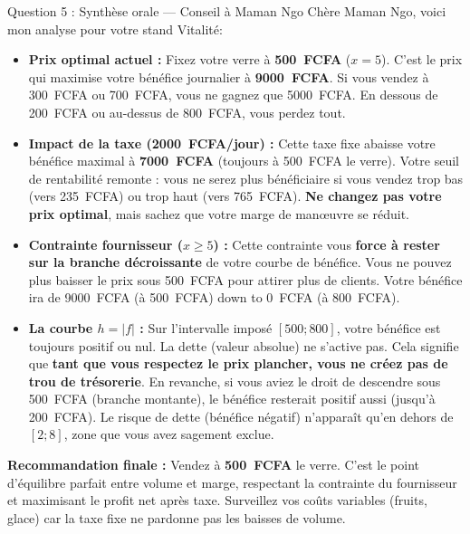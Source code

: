 \documentclass[11pt]{article}
\begin{document}
\begin{exoresolu}{Question 5 : Synthèse orale — Conseil à Maman Ngo}
\og Chère Maman Ngo, voici mon analyse pour votre stand \og Vitalité\fg :

\begin{itemize}
    \item \textbf{Prix optimal actuel :} Fixez votre verre à \textbf{\SI{500}{FCFA}} ($x=5$). C'est le prix qui maximise votre bénéfice journalier à \textbf{\SI{9000}{FCFA}}. Si vous vendez à \SI{300}{FCFA} ou \SI{700}{FCFA}, vous ne gagnez que \SI{5000}{FCFA}. En dessous de \SI{200}{FCFA} ou au-dessus de \SI{800}{FCFA}, vous perdez tout.
    \item \textbf{Impact de la taxe (\SI{2000}{FCFA}/jour) :} Cette taxe fixe abaisse votre bénéfice maximal à \textbf{\SI{7000}{FCFA}} (toujours à \SI{500}{FCFA} le verre). Votre seuil de rentabilité remonte : vous ne serez plus bénéficiaire si vous vendez trop bas (vers \SI{235}{FCFA}) ou trop haut (vers \SI{765}{FCFA}). \textbf{Ne changez pas votre prix optimal}, mais sachez que votre marge de manœuvre se réduit.
    \item \textbf{Contrainte fournisseur ($x \ge 5$) :} Cette contrainte vous \textbf{force à rester sur la branche décroissante} de votre courbe de bénéfice. Vous ne pouvez plus baisser le prix sous \SI{500}{FCFA} pour attirer plus de clients. Votre bénéfice ira de \SI{9000}{FCFA} (à \SI{500}{FCFA}) down to \SI{0}{FCFA} (à \SI{800}{FCFA}).
    \item \textbf{La courbe $h=|f|$ :} Sur l'intervalle imposé $[500; 800]$, votre bénéfice est toujours positif ou nul. La \og dette \fg (valeur absolue) ne s'active pas. Cela signifie que \textbf{tant que vous respectez le prix plancher, vous ne créez pas de trou de trésorerie}. En revanche, si vous aviez le droit de descendre sous \SI{500}{FCFA} (branche montante), le bénéfice resterait positif aussi (jusqu'à \SI{200}{FCFA}). Le risque de \og dette \fg (bénéfice négatif) n'apparaît qu'en dehors de $[2;8]$, zone que vous avez sagement exclue.
\end{itemize}
\textbf{Recommandation finale :} Vendez à \textbf{\SI{500}{FCFA}} le verre. C'est le point d'équilibre parfait entre volume et marge, respectant la contrainte du fournisseur et maximisant le profit net après taxe. Surveillez vos coûts variables (fruits, glace) car la taxe fixe ne pardonne pas les baisses de volume. \fg
\end{exoresolu}
\end{document}
